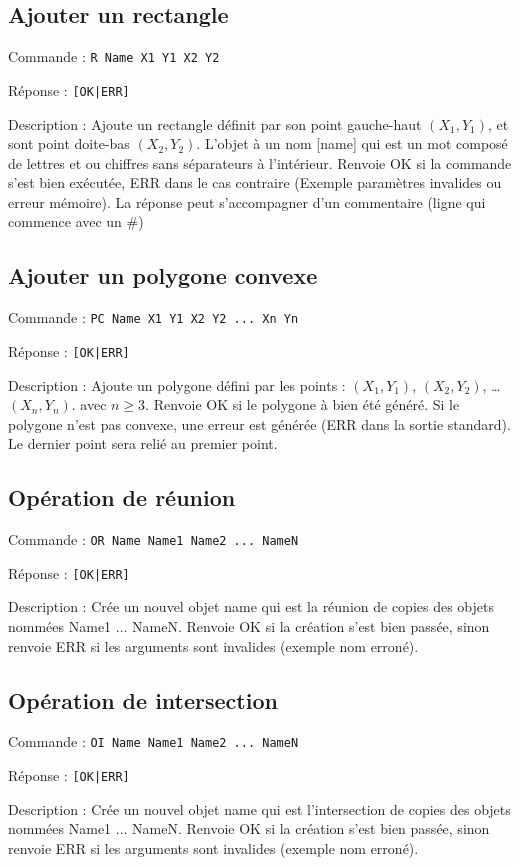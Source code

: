\documentclass[11pt]{article}
\begin{document}
\subsection{Ajouter un rectangle}
Commande : \texttt{R Name X1 Y1 X2 Y2}

Réponse : \texttt{[OK|ERR]}

Description : 
Ajoute un rectangle définit par son point gauche-haut $(X_1,Y_1)$, et sont point doite-bas $(X_2,Y_2)$. L'objet à un nom [name] qui est un mot composé de lettres et ou chiffres sans séparateurs à l'intérieur. Renvoie OK si la commande s'est bien exécutée, ERR dans le cas contraire (Exemple paramètres invalides ou erreur mémoire). La réponse peut s’accompagner d'un commentaire (ligne qui commence avec un \#)

\subsection{Ajouter un polygone convexe}
Commande : \texttt{PC Name X1 Y1 X2 Y2 ... Xn Yn}

Réponse : \texttt{[OK|ERR]}

Description : 
Ajoute un polygone défini par les points : $(X_1,Y_1)$, $(X_2,Y_2)$, \dots  $(X_n,Y_n)$. avec $n \geq 3$. Renvoie OK si le polygone à bien été généré. Si le polygone n'est pas convexe, une erreur est générée (ERR dans la sortie standard). Le dernier point sera relié au premier point.

\subsection{Opération de réunion}
Commande : \texttt{OR Name Name1 Name2 ... NameN}

Réponse : \texttt{[OK|ERR]}

Description : 
Crée un nouvel objet name qui est la réunion de copies des objets nommées Name1 ... NameN. Renvoie OK si la création s'est bien passée, sinon renvoie ERR si les arguments sont invalides (exemple nom erroné).

\subsection{Opération de intersection}
Commande : \texttt{OI Name Name1 Name2 ... NameN}

Réponse : \texttt{[OK|ERR]}

Description : 
Crée un nouvel objet name qui est l'intersection de copies des objets nommées Name1 ... NameN. Renvoie OK si la création s'est bien passée, sinon renvoie ERR si les arguments sont invalides (exemple nom erroné).
\end{document}
